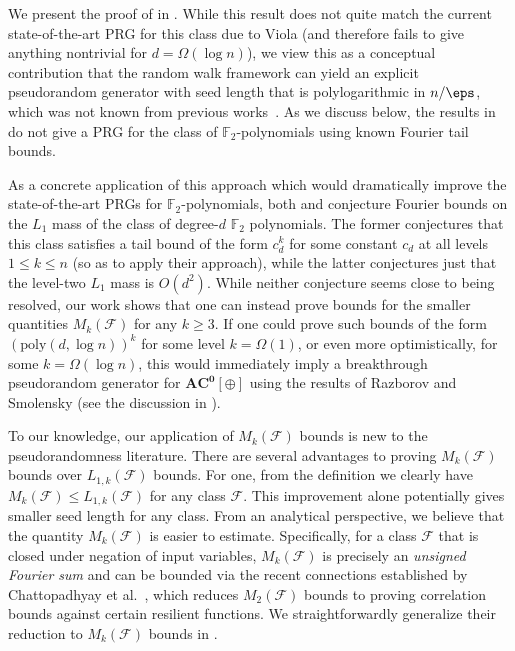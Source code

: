We present the proof of  in . While this result does not quite match the current state-of-the-art PRG for this class due to Viola \cite{viola2009sum}  (and therefore fails to give anything nontrivial for $d=\Omega(\log n)$),  we view this as a conceptual contribution  that the random walk framework can yield an explicit pseudorandom generator with seed length that is polylogarithmic in $n/\eps$, which was not known from previous works~\cite{CHHL,CHLT}.  As we discuss below, the results in \cite{CHHL,CHLT} do not give a PRG for the class of $\mathbb{F}_2$-polynomials using known Fourier tail bounds. 

As a concrete application of this approach which would dramatically improve the state-of-the-art PRGs for $\mathbb{F}_2$-polynomials, both \cite{CHHL} and \cite{CHLT} conjecture Fourier bounds on the $L_1$ mass of the class of degree-$d$ $\mathbb{F}_2$ polynomials. The former conjectures that this class satisfies a tail bound of the form $c_d^k$ for some constant $c_d$ at all levels $1\leq k\leq n$ (so as to apply their approach), while the latter conjectures just that the level-two $L_1$ mass is $O(d^2)$.  While neither conjecture seems close to being resolved, {our work shows that one can instead prove bounds for the smaller quantities $M_k(\mathcal{F})$ for any $k\geq 3$.} If one could prove such bounds of the form $(\text{poly}(d,\log n))^k$ for some level $k=\Omega(1)$, or even more optimistically, for some $k=\Omega(\log n)$, this would immediately imply a breakthrough pseudorandom generator for $\mathbf{AC^0[\oplus]}$ using the results of Razborov \cite{Razborov1987} and Smolensky \cite{Smolensky1,Smolensky2} (see the discussion in \cite{CHLT}).



{To our knowledge, our application of $M_k(\mathcal{F})$ bounds is new to the pseudorandomness literature.  There are several advantages to proving $M_k(\mathcal{F})$ bounds over $L_{1,k}(\mathcal{F})$ bounds. For one, from the definition we clearly have $M_{k}(\mathcal{F})\leq L_{1,k}(\mathcal{F})$ for any class $\mathcal{F}$.  This improvement alone potentially gives smaller seed length for any class. From an analytical perspective, we believe that the quantity $M_k(\mathcal{F})$ is easier to estimate.  Specifically, for a class $\mathcal{F}$ that is closed under negation of input variables, $M_k(\mathcal{F})$ is precisely an \emph{unsigned
%
Fourier sum} and can be bounded via the recent connections established by Chattopadhyay {et al.}~\cite{xorlemma}, which reduces $M_2(\mathcal{F})$ bounds to proving correlation bounds against certain resilient functions.  We straightforwardly generalize their reduction to $M_k(\mathcal{F})$ bounds in .}

